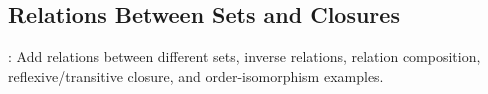 \subsection{Relations Between Sets and Closures}

: Add relations between different sets, inverse relations, relation composition, reflexive/transitive closure, and order-isomorphism examples.
